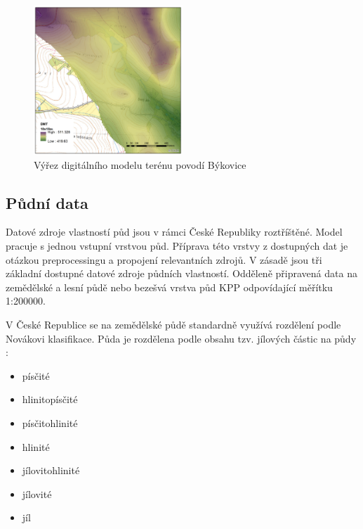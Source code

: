 \begin{figure}
  \centering
  \includegraphics[width=0.5\textwidth]{./img/DMT_byk.png}
  \caption{Výřez digitálního modelu terénu povodí Býkovice}
  \label{fig:bykovicedmt}
\end{figure}

 
 
 
 
 
 
 
 
 
 
 
 
 
 
 
 
 
 
 
\subsection{Půdní data} \label{sec:vstuppuda}

Datové zdroje vlastností půd jsou v rámci České Republiky roztříštěné. Model \smod pracuje s jednou vstupní vrstvou půd. Příprava této vrstvy z dostupných dat je otázkou preprocessingu a propojení relevantních zdrojů. V zásadě jsou tři základní dostupné datové zdroje půdních vlastností. Odděleně připravená  data na zemědělské a lesní půdě nebo bezešvá vrstva půd KPP odpovídající měřítku 1:200000.

V České Republice se na zemědělské půdě standardně využívá rozdělení podle Novákovi klasifikace. Půda je rozdělena podle obsahu tzv. jílových částic na půdy \cite{kavka} :
\begin{itemize} \itemsep -3pt
  \item písčité
  \item hlinitopísčité
  \item písčitohlinité
  \item hlinité
  \item jílovitohlinité
  \item jílovité
  \item jíl
\end{itemize}

